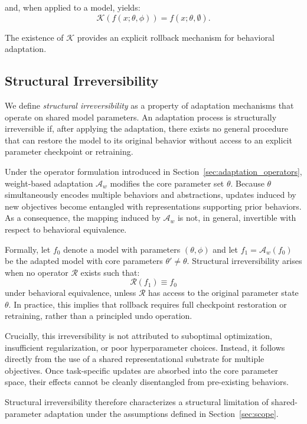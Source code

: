 \documentclass[10pt]{article}
\begin{document}
	and, when applied to a model, yields:
	\[
	\mathcal{K}(f(x;\theta,\phi)) = f(x;\theta,\emptyset).
	\]
	
	The existence of $\mathcal{K}$ provides an explicit rollback mechanism for behavioral adaptation.
	
	\subsection{Structural Irreversibility}
	\label{sec:irreversibility}
	
	We define \emph{structural irreversibility} as a property of adaptation mechanisms that operate on shared model parameters. An adaptation process is structurally irreversible if, after applying the adaptation, there exists no general procedure that can restore the model to its original behavior without access to an explicit parameter checkpoint or retraining.

	Under the operator formulation introduced in Section~\ref{sec:adaptation_operators}, weight-based adaptation $\mathcal{A}_w$ modifies the core parameter set $\theta$. Because $\theta$ simultaneously encodes multiple behaviors and abstractions, updates induced by new objectives become entangled with representations supporting prior behaviors. As a consequence, the mapping induced by $\mathcal{A}_w$ is not, in general, invertible with respect to behavioral equivalence.

	Formally, let $f_0$ denote a model with parameters $(\theta,\phi)$ and let $f_1 = \mathcal{A}_w(f_0)$ be the adapted model with core parameters $\theta' \neq \theta$. Structural irreversibility arises when no operator $\mathcal{R}$ exists such that:
	\[
	\mathcal{R}(f_1) \equiv f_0
	\]
	under behavioral equivalence, unless $\mathcal{R}$ has access to the original parameter state $\theta$. In practice, this implies that rollback requires full checkpoint restoration or retraining, rather than a principled undo operation.

	Crucially, this irreversibility is not attributed to suboptimal optimization, insufficient regularization, or poor hyperparameter choices. Instead, it follows directly from the use of a shared representational substrate for multiple objectives. Once task-specific updates are absorbed into the core parameter space, their effects cannot be cleanly disentangled from pre-existing behaviors.

	Structural irreversibility therefore characterizes a structural limitation of shared-parameter adaptation under the assumptions defined in Section~\ref{sec:scope}.
	
\end{document}
